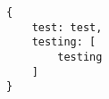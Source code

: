 \begin{minipage}[c]{\textwidth}
\begin{lstlisting}[caption={Codebeispiel Restdoc},label={lst:codebeispiel_restdoc}]
{
	test: test,
	testing: [
		testing
	]
}
\end{lstlisting}
\end{minipage}